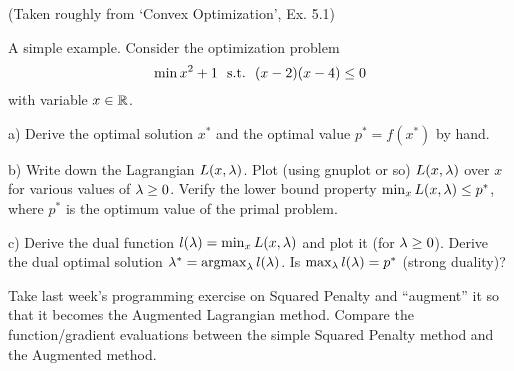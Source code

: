 

(Taken roughly from `Convex Optimization', Ex. 5.1)

A simple example. Consider the optimization problem
$$\min x^2 + 1 ~~\text{s.t.}~~ (x-2)(x-4) \le 0$$
with variable $x \in {\mathbb{R}}$.

a) Derive the optimal solution $x^*$ and the optimal value
$p^*=f(x^*)$ by hand.

b) Write down the Lagrangian $L(x,\lambda)$. Plot (using gnuplot or so)
$L(x,\lambda)$ over $x$ for various values of $\lambda\ge 0$. Verify the
lower bound property $\min_x L(x,\lambda) \le p^*$, where $p^*$ is the
optimum value of the primal problem.

c) Derive the dual function $l(\lambda) = \min_x L(x,\lambda)$ and plot it (for $\lambda\ge
0$). Derive the dual optimal solution $\lambda^* = \operatorname*{argmax}_\lambda l(\lambda)$. Is
$\max_\lambda l(\lambda) = p^*$ (strong duality)?




Take last week's programming exercise on Squared Penalty and ``augment'' it so
that it becomes the Augmented Lagrangian method.  Compare the function/gradient
evaluations between the simple Squared Penalty method and the Augmented method.

\exerfoot
